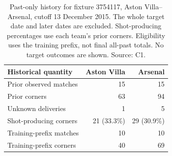 \begin{table}[tbp]
\caption{Past-only history for fixture 3754117, Aston Villa--Arsenal, cutoff 13 December 2015. The whole target date and later dates are excluded. Shot-producing percentages use each team's prior corners. Eligibility uses the training prefix, not final all-past totals. No target outcomes are shown. Source: C1.}
\label{tab:dossier-history}
\centering
\normalsize
\setlength{\tabcolsep}{3.5pt}
\begin{tabular}{@{}lrr@{}}
\toprule
Historical quantity & Aston Villa & Arsenal \\
\midrule
Prior observed matches & 15 & 15 \\
Prior corners & 63 & 94 \\
Unknown deliveries & 1 & 5 \\
Shot-producing corners & 21 (33.3\%) & 29 (30.9\%) \\
Training-prefix matches & 10 & 10 \\
Training-prefix corners & 40 & 69 \\
\bottomrule
\end{tabular}
\end{table}
